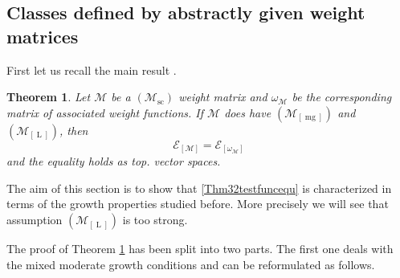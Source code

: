 \documentclass[10pt]{amsart}%
\numberwithin{equation}{section}
\theoremstyle{plain}
\newtheorem{theorem}[proposition]{Theorem}
\let\on=\operatorname
\begin{document}
\subsection{Classes defined by abstractly given weight matrices}\label{consequencesforultrasequ}
First let us recall the main result \cite[Theorem 3.2]{testfunctioncharacterization}.

\begin{theorem}\label{Thm32testfunc}
Let $\mathcal{M}$ be a \hyperlink{Msc}{$(\mathcal{M}_{\on{sc}})$} weight matrix and $\omega_{\mathcal{M}}$ be the corresponding matrix of associated weight functions. If $\mathcal{M}$ does have $(\mathcal{M}_{[\on{mg}]})$ and $(\mathcal{M}_{[\on{L}]})$, then
\begin{equation}\label{Thm32testfuncequ}
\mathcal{E}_{[\mathcal{M}]}=\mathcal{E}_{[\omega_{\mathcal{M}}]}
\end{equation}
and the equality holds as top. vector spaces.
\end{theorem}

The aim of this section is to show that \eqref{Thm32testfuncequ} is characterized in terms of the growth properties studied before. More precisely we will see that assumption $(\mathcal{M}_{[\on{L}]})$ is too strong.

The proof of Theorem \ref{Thm32testfunc} has been split into two parts. The first one \cite[Theorem 3.4]{testfunctioncharacterization} deals with the mixed moderate growth conditions and can be reformulated as follows.
\end{document}
